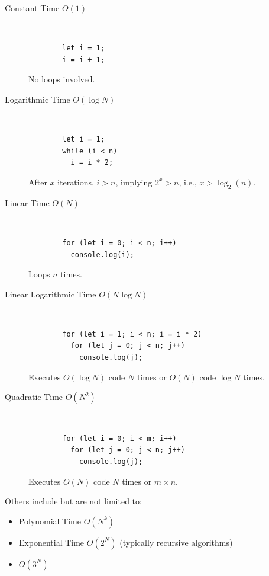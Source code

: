 \documentclass[11pt,journal,compsoc]{IEEEtran}
\begin{document}
\begin{description}
    \item[Constant Time \(O(1)\)] ~

    \begin{verbatim}
        let i = 1;
        i = i + 1;
    \end{verbatim}

    No loops involved.

    \item[Logarithmic Time \(O(\log N)\)] ~

    \begin{verbatim}
        let i = 1;
        while (i < n)
          i = i * 2;
    \end{verbatim}

    After \(x\) iterations, \(i > n\), implying \(2^x > n\), i.e., \(x > \log_2 (n)\).

    \item[Linear Time \(O(N)\)] ~

    \begin{verbatim}
        for (let i = 0; i < n; i++)
          console.log(i);
    \end{verbatim}

    Loops \(n\) times.

    \item[Linear Logarithmic Time \(O(N \log N)\)] ~

    \begin{verbatim}
        for (let i = 1; i < n; i = i * 2)
          for (let j = 0; j < n; j++)
            console.log(j);
    \end{verbatim}

    Executes \(O(\log N)\) code \(N\) times or \(O(N)\) code \(\log N\) times.

    \item[Quadratic Time \(O(N^2)\)] ~

    \begin{verbatim}
        for (let i = 0; i < m; i++)
          for (let j = 0; j < n; j++)
            console.log(j);
    \end{verbatim}

    Executes \(O(N)\) code \(N\) times or \(m \times n\).

\end{description}

Others include but are not limited to:

\begin{itemize}
    \item Polynomial Time \(O(N^k)\)

    \item Exponential Time \(O(2^N)\) (typically recursive algorithms)

    \item \(O(3^N)\)
\end{itemize}
\end{document}
